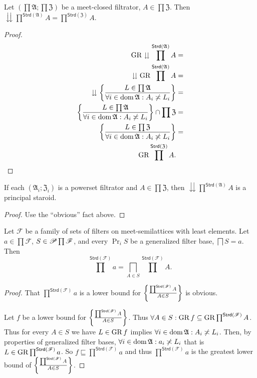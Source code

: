 \begin{prop}
Let $\left(\prod\mathfrak{A};\prod\mathfrak{Z}\right)$ be a meet-closed
filtrator, $A\in\prod\mathfrak{Z}$. Then $\downdownarrows\prod^{\mathsf{Strd}(\mathfrak{A})}A=\prod^{\mathsf{Strd}(\mathfrak{Z})}A$.\end{prop}
\begin{proof}
~
\begin{align*}
\operatorname{GR}\downdownarrows\prod^{\mathsf{Strd}(\mathfrak{A})}A & =\\
\downdownarrows\operatorname{GR}\prod^{\mathsf{Strd}(\mathfrak{A})}A & =\\
\downdownarrows\left\{ \frac{L\in\prod\mathfrak{A}}{\forall i\in\operatorname{dom}\mathfrak{A}:A_{i}\not\asymp L_{i}}\right\} & =\\
\left\{ \frac{L\in\prod\mathfrak{A}}{\forall i\in\operatorname{dom}\mathfrak{A}:A_{i}\not\asymp L_{i}}\right\}\cap\prod\mathfrak{Z} & =\\
\left\{ \frac{L\in\prod\mathfrak{Z}}{\forall i\in\operatorname{dom}\mathfrak{A}:A_{i}\not\asymp L_{i}}\right\} & =\\
\operatorname{GR}\prod^{\mathsf{Strd}(\mathfrak{Z})}A.
\end{align*}
\end{proof}
\begin{cor}
If each $(\mathfrak{A}_{i};\mathfrak{Z}_{i})$ is a powerset filtrator
and $A\in\prod\mathfrak{Z}$, then $\downdownarrows\prod^{\mathsf{Strd}(\mathfrak{A})}A$
is a principal staroid.\end{cor}
\begin{proof}
Use the ``obvious'' fact above.\end{proof}
\begin{thm}
\label{meet-fprods}Let $\mathscr{F}$ be a family of sets of filters
on meet-semilattices with least elements. Let $a\in\prod\mathscr{F}$,
$S\in\mathscr{P}\prod\mathscr{F}$, and every $\Pr_{i}S$ be a generalized
filter base, $\bigsqcap S=a$. Then 
\[
\prod^{\mathsf{Strd}(\mathscr{F})}a=\bigsqcap_{A\in S}\prod^\mathsf{Strd(\mathscr{F})}A.
\]
\end{thm}
\begin{proof}
That $\prod^{\mathsf{Strd}(\mathscr{F})}a$ is a lower bound for $\left\{ \frac{\prod^{\mathsf{Strd}(\mathscr{F})}A}{A\in S}\right\}$
is obvious.

Let $f$ be a lower bound for $\left\{ \frac{\prod^{\mathsf{Strd}(\mathscr{F})}A}{A\in S}\right\}$.
Thus $\forall A\in S:\operatorname{GR} f\subseteq\operatorname{GR}\prod^{\mathsf{Strd}(\mathscr{F})}A$.
Thus for every $A\in S$ we have $L\in\operatorname{GR} f$ implies $\forall i\in\operatorname{dom}\mathfrak{A}:A_{i}\not\asymp L_{i}$.
Then, by properties of generalized filter bases, $\forall i\in\operatorname{dom}\mathfrak{A}:a_{i}\not\asymp L_{i}$
that is $L\in\operatorname{GR}\prod^{\mathsf{Strd}(\mathscr{F})}a$.
So $f\sqsubseteq\prod^{\mathsf{Strd}(\mathscr{F})}a$ and thus $\prod^{\mathsf{Strd}(\mathscr{F})}a$ is the greatest lower bound of $\left\{ \frac{\prod^{\mathsf{Strd}(\mathscr{F})}A}{A\in S}\right\}$.\end{proof}
